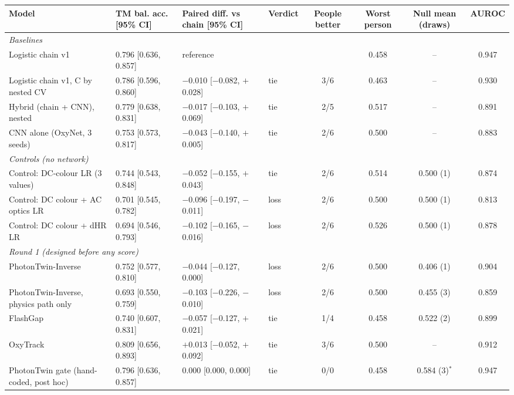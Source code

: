 {\footnotesize
\setlength{\tabcolsep}{4pt}
\begin{adjustbox}{max width=\linewidth}
\begin{tabular}{p{3.6cm}lllcccc}
\toprule
Model & TM bal. acc. [95\% CI] & Paired diff. vs chain [95\% CI] & Verdict & People better & Worst person & Null mean (draws) & AUROC \\
\midrule
\multicolumn{8}{l}{\emph{Baselines}} \\
Logistic chain v1 & 0.796 [0.636, 0.857] & reference &  &  & 0.458 & -- & 0.947 \\
Logistic chain v1, C by nested CV & 0.786 [0.596, 0.860] & $-$0.010 [$-$0.082, $+$0.028] & tie & 3/6 & 0.463 & -- & 0.930 \\
Hybrid (chain + CNN), nested & 0.779 [0.638, 0.831] & $-$0.017 [$-$0.103, $+$0.069] & tie & 2/5 & 0.517 & -- & 0.891 \\
CNN alone (OxyNet, 3 seeds) & 0.753 [0.573, 0.817] & $-$0.043 [$-$0.140, $+$0.005] & tie & 2/6 & 0.500 & -- & 0.883 \\
\multicolumn{8}{l}{\emph{Controls (no network)}} \\
Control: DC-colour LR (3 values) & 0.744 [0.543, 0.848] & $-$0.052 [$-$0.155, $+$0.043] & tie & 2/6 & 0.514 & 0.500 (1) & 0.874 \\
Control: DC colour + AC optics LR & 0.701 [0.545, 0.782] & $-$0.096 [$-$0.197, $-$0.011] & loss & 2/6 & 0.500 & 0.500 (1) & 0.813 \\
Control: DC colour + dHR LR & 0.694 [0.546, 0.793] & $-$0.102 [$-$0.165, $-$0.016] & loss & 2/6 & 0.526 & 0.500 (1) & 0.878 \\
\multicolumn{8}{l}{\emph{Round 1 (designed before any score)}} \\
PhotonTwin-Inverse & 0.752 [0.577, 0.810] & $-$0.044 [$-$0.127, 0.000] & loss & 2/6 & 0.500 & 0.406 (1) & 0.904 \\
PhotonTwin-Inverse, physics path only & 0.693 [0.550, 0.759] & $-$0.103 [$-$0.226, $-$0.010] & loss & 2/6 & 0.500 & 0.455 (3) & 0.859 \\
FlashGap & 0.740 [0.607, 0.831] & $-$0.057 [$-$0.127, $+$0.021] & tie & 1/4 & 0.458 & 0.522 (2) & 0.899 \\
OxyTrack & 0.809 [0.656, 0.893] & $+$0.013 [$-$0.052, $+$0.092] & tie & 3/6 & 0.500 & -- & 0.912 \\
PhotonTwin gate (hand-coded, post hoc) & 0.796 [0.636, 0.857] & 0.000 [0.000, 0.000] & tie & 0/0 & 0.458 & 0.584 (3)$^{*}$ & 0.947 \\

\end{tabular}
\end{adjustbox}}
